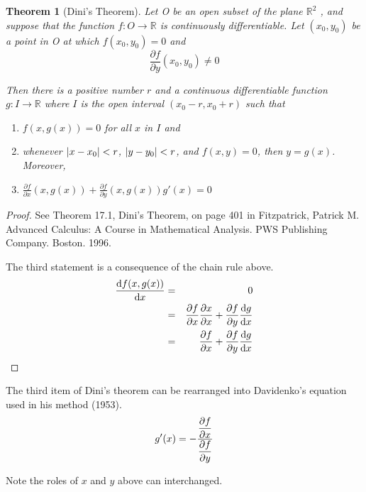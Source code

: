 \documentclass[11pt]{article} %
\newtheorem{theorem}{Theorem}
\begin{document}
\begin{theorem}[Dini's Theorem]
Let O be an open subset of the plane $ \mathbb{R}^2 $ , and suppose that the function $ f:O \rightarrow \mathbb{R} $ is continuously differentiable. Let $ (x_0, y_0) $ be a point in O at which $ f(x_0,y_0) = 0$ and
\begin{equation}
\frac{\partial f}{\partial y}(x_0, y_0) \neq 0
\end{equation}

Then there is a positive number $ r $ and a continuous differentiable function $ g:I \rightarrow \mathbb{R} $ where $ I$ is the open interval $ (x_0 -r, x_0 +r) $ such that
\begin{enumerate}
\item $ f(x, g(x)) = 0 $ for all $ x $  in $  I $ and
\item whenever $ \abs{x - x_0} < r $, $\abs{y-y_0} < r $, and $ f(x,y) = 0 $, then $ y =g(x) $. Moreover,
\item $ \frac{\partial f}{\partial x}(x, g(x)) + \frac{\partial f}{\partial y}(x, g(x)) g'(x) = 0 $
\end{enumerate}

\end{theorem}
\begin{proof}
See Theorem 17.1, Dini's Theorem, on page 401 in Fitzpatrick, Patrick M. Advanced Calculus: A Course in Mathematical Analysis. PWS Publishing Company. Boston. 1996.

The third statement is a consequence of the chain rule above.
\begin{eqnarray}
\dv{f(x,g(x))}{x} & = &  0 \\
            & = & \pdv{f}{x} \pdv{x}{x} + \pdv{f}{y} \dv{g}{x} \\
            & = & \pdv{f}{x} + \pdv{f}{y} \dv{g}{x}
\end{eqnarray}
\end{proof}

The third item of Dini's theorem can be rearranged into Davidenko's equation used in his method (1953).
\begin{equation}
g'(x) =  - \frac{ \displaystyle \pdv{f}{x} } { \displaystyle \pdv{f}{y} }
\end{equation}

Note the roles of $ x $ and $ y $ above can interchanged.
\newline
\end{document}
